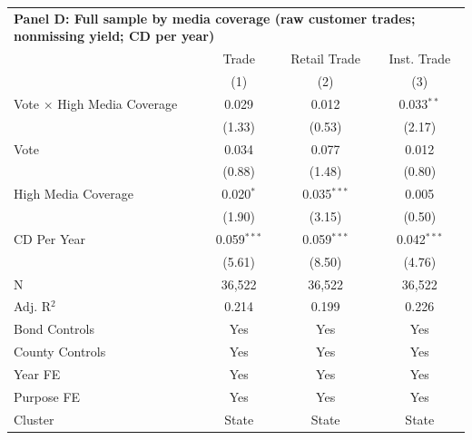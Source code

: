 \begingroup
\centering
\begin{tabular*}{\textwidth}{@{\extracolsep{\fill}}lccc}
\multicolumn{5}{l}{\textbf{Panel D: Full sample by media coverage (raw customer trades; nonmissing yield; CD per year)}}\\

\addlinespace
   \toprule
                                      & Trade         & Retail Trade  & Inst. Trade\\  
                                      & (1)           & (2)           & (3)\\  
   \midrule 
   Vote $\times$ High Media Coverage  & 0.029         & 0.012         & 0.033$^{**}$\\   
                                      & (1.33)       & (0.53)       & (2.17)\\   
   Vote                               & 0.034         & 0.077         & 0.012\\   
                                      & (0.88)       & (1.48)       & (0.80)\\   
   High Media Coverage                & 0.020$^{*}$   & 0.035$^{***}$ & 0.005\\   
                                      & (1.90)       & (3.15)       & (0.50)\\   
   CD Per Year                        & 0.059$^{***}$ & 0.059$^{***}$ & 0.042$^{***}$\\   
                                      & (5.61)       & (8.50)       & (4.76)\\   
   \hline
   N                       & 36,522        & 36,522        & 36,522\\  
   Adj. R$^2$                     & 0.214         & 0.199         & 0.226\\  
   Bond Controls                      & Yes           & Yes           & Yes\\  
   County Controls                    & Yes           & Yes           & Yes\\  
   Year FE                            & Yes           & Yes           & Yes\\  
   Purpose FE                         & Yes           & Yes           & Yes\\  
   Cluster              & State & State & State\\  
   \bottomrule
\end{tabular*}
\par\endgroup
